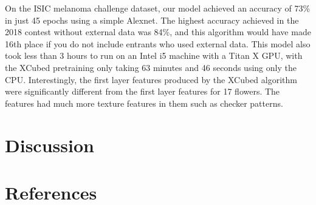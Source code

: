 \documentclass{article}
\begin{document}
On the ISIC melanoma challenge dataset, our model achieved an accuracy of 73\% in just 45 epochs using a simple Alexnet. The highest accuracy achieved in the 2018 contest without external data was 84\%, and this algorithm would have made 16th place if you do not include entrants who used external data. This model also took less than 3 hours to run on an Intel i5 machine with a Titan X GPU, with the XCubed pretraining only taking 63 minutes and 46 seconds using only the CPU. Interestingly, the first layer features produced by the XCubed algorithm were significantly different from the first layer features for 17 flowers. The features had much more texture features in them such as checker patterns.
\section{Discussion}
\section{References}


\end{document}
